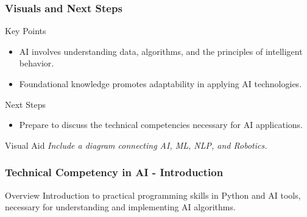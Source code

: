 \documentclass[aspectratio=169]{beamer}
\begin{document}
\begin{frame}[fragile]
    \frametitle{Visuals and Next Steps}

    \begin{block}{Key Points}
        \begin{itemize}
            \item AI involves understanding data, algorithms, and the principles of intelligent behavior.
            \item Foundational knowledge promotes adaptability in applying AI technologies.
        \end{itemize}
    \end{block}

    \begin{block}{Next Steps}
        \begin{itemize}
            \item Prepare to discuss the technical competencies necessary for AI applications.
        \end{itemize}
    \end{block}

    \begin{block}{Visual Aid}
        \textit{Include a diagram connecting AI, ML, NLP, and Robotics.}
    \end{block}
\end{frame}

\begin{frame}[fragile]
    \frametitle{Technical Competency in AI - Introduction}
    \begin{block}{Overview}
        Introduction to practical programming skills in Python and AI tools, necessary for understanding and implementing AI algorithms.
    \end{block}
\end{frame}
\end{document}
